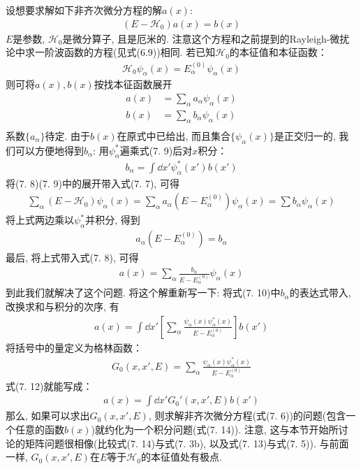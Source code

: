 设想要求解如下非齐次微分方程的解$a(x)$:
\begin{align}
(E - \mathscr{H}_0)a(x) = b(x)
\end{align}
$E$是参数, $\mathscr{H}_0$是微分算子, 且是厄米的. 注意这个方程和之前提到的Rayleigh-\sch 微扰论中求一阶波函数的方程(见式(6.9))相同. 若已知$\mathscr{H}_0$的本征值和本征函数：
\begin{align}
\mathscr{H}_0\psi_\alpha(x) = E_\alpha^{(0)} \psi_\alpha(x)
\end{align}
则可将$a(x),b(x)$按找本征函数展开
\begin{align}
a(x) & = \sum_\alpha a_\alpha \psi_\alpha(x)\\
b(x) & = \sum_\alpha b_\alpha \psi_\alpha(x)\\
\end{align}
系数$\{ a_\alpha \}$待定. 
由于$b(x)$在原式中已给出, 
而且集合$\{ \psi_\alpha(x)\}$是正交归一的, 
我们可以方便地得到$b_\alpha$: 用$\psi_\alpha^*$遍乘式(7.
9)后对$x$积分：
\begin{align}
b_\alpha = \int\dd x'\psi_\alpha^*(x')b(x')
\end{align}
将(7.
8)(7.
9)中的展开带入式(7.
7), 
可得
\begin{align*}
\sum_\alpha (E - \mathscr{H}_0)\psi_\alpha(x) = \sum_\alpha a_\alpha (E - E_\alpha^{(0)}) \psi_\alpha(x) = \sum b_\alpha\psi_\alpha(x)
\end{align*}
将上式两边乘以$\psi_\alpha^*$并积分, 
得到
\begin{align*}
a_\alpha (E - E_\alpha^{(0)}) = b_{\alpha}
\end{align*}
最后, 
将上式带入式(7.
8), 
可得
\begin{align}
a(x) = \sum_\alpha \frac{b_{\alpha}}{E - E_\alpha^{(0)}} \psi_\alpha(x)
\end{align}
到此我们就解决了这个问题. 
将这个解重新写一下: 将式(7.
10)中$b_\alpha$的表达式带入, 
改换求和与积分的次序, 
有
\begin{align}
a(x) = \int\dd x'\left[ \sum_\alpha \frac{\psi_\alpha(x)\psi_\alpha^*(x)}{E - E_\alpha^{(0)}} \right] b(x')
\end{align}
将括号中的量定义为格林函数：
\begin{align}
G_0 (x,x',E) = \sum_\alpha \frac{\psi_\alpha(x)\psi_\alpha^*(x)}{E - E_\alpha^{(0)}}
\end{align}
式(7.
12)就能写成：
\begin{align}
a(x) = \int\dd x' G_0'(x,x',E)b(x')
\end{align}
那么, 
如果可以求出$G_0(x,x',E)$, 
则求解非齐次微分方程(式(7.
6))的问题(包含一个任意的函数$b(x)$)就约化为一个积分问题(式(7.
14)). 
注意, 
这与本节开始所讨论的矩阵问题很相像(比较式(7.
14)与式(7.
3b), 
以及式(7.
13)与式(7.
5)). 
与前面一样, 
$G_0(x,x',E)$在$E$等于$\mathscr{H}_0$的本征值处有极点.


